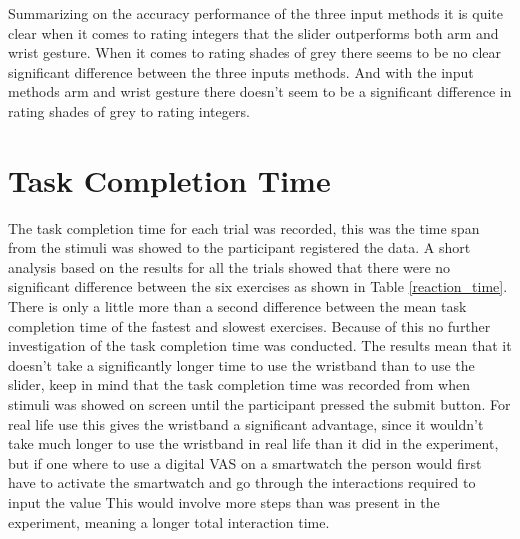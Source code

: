 Summarizing on the accuracy performance of the three input methods it is quite clear when it comes to rating integers that the slider outperforms both arm and wrist gesture. When it comes to rating shades of grey there seems to be no clear significant difference between the three inputs methods. And with the input methods arm and wrist gesture there doesn't seem to be a significant difference in rating shades of grey to rating integers.

\section{Task Completion Time}
The task completion time for each trial was recorded, this was the time span from the stimuli was showed to the participant registered the data. A short analysis based on the results for all the trials showed that there were no significant difference between the six exercises as shown in Table \ref{reaction_time}. There is only a little more than a second difference between the mean task completion time of the fastest and slowest exercises. Because of this no further investigation of the task completion time was conducted. The results mean that it doesn't take a significantly longer time to use the wristband than to use the slider, keep in mind that the task completion time was recorded from when stimuli was showed on screen until the participant pressed the submit button. For real life use this gives the wristband a significant advantage, since it wouldn't take much longer to use the wristband in real life than it did in the experiment, but if one where to use a digital VAS on a smartwatch the person would first have to activate the smartwatch and go through the interactions required to input the value This would involve more steps than was present in the experiment, meaning a longer total interaction time.

